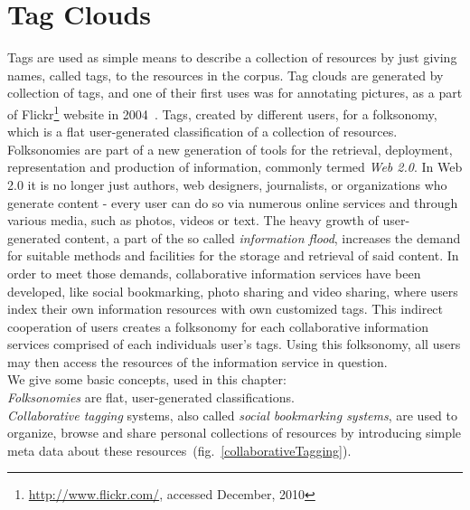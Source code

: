 





\chapter{Tag Clouds}
\label{sec:tagclouds}

Tags are used as simple means to describe a collection of resources by just giving names, called tags, to the resources in the corpus. Tag clouds are generated by collection of tags, and one of their first uses was for annotating pictures, as a part of Flickr\footnote{\url{http://www.flickr.com/}, accessed December, 2010} website in 2004~\cite{folksonomiesWeb2.0_2009}. Tags, created by different users, for a folksonomy, which is a flat user-generated classification of a collection of resources. Folksonomies are part of a new generation of tools for the retrieval, deployment, representation and production of information, commonly termed \textit{Web 2.0}. In Web 2.0 it is no longer just authors, web designers, journalists, or organizations who generate content - every user can do so via numerous online services and through various media, such as photos, videos or text. The heavy growth of user-generated content, a part of the so called \textit{information flood}, increases the demand for suitable methods and facilities for the storage and retrieval of said content. In order to meet those demands, collaborative information services have been developed, like social bookmarking, photo sharing and video sharing, where users index their own information resources with own customized tags. This indirect cooperation of users creates a folksonomy for each collaborative information services comprised of each individuals user's tags. Using this folksonomy, all users may then access the resources of the information service in question. \\ 

We give some basic concepts, used in this chapter:\\

\textit{Folksonomies} are flat, user-generated classifications. \\

\textit{Collaborative tagging} systems, also called \textit{social bookmarking systems}, are used to organize, browse and share personal collections of resources by introducing simple meta data about these resources~(fig.~\ref{collaborativeTagging}). \\

